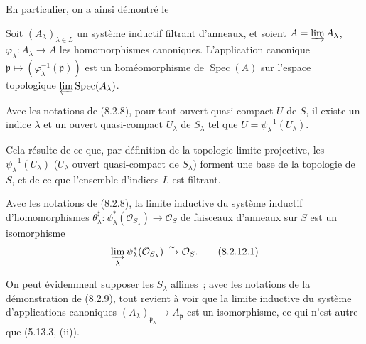 En particulier, on a ainsi démontré le

\begin{corollary}[8.2.10]
\label{IV.8.2.10-fr}
Soit $(A_\lambda)_{\lambda\in L}$ un système inductif filtrant d'anneaux, et
soient $A=\varinjlim A_\lambda$, $\varphi_\lambda:A_\lambda\to A$ les
homomorphismes canoniques. L'application canonique
$\mathfrak p\mapsto(\varphi_\lambda^{-1}(\mathfrak p))$ est un
homéomorphisme de $\operatorname{Spec}(A)$ sur l'espace topologique
$\varprojlim\operatorname{Spec}(A_\lambda)$.
\end{corollary}

\begin{corollary}[8.2.11]
Avec les notations de (8.2.8), pour tout ouvert quasi-compact $U$ de $S$, il
existe un indice $\lambda$ et un ouvert quasi-compact $U_\lambda$ de
$S_\lambda$ tel que $U=\psi_\lambda^{-1}(U_\lambda)$.
\end{corollary}

Cela résulte de ce que, par définition de la topologie limite projective, les
$\psi_\lambda^{-1}(U_\lambda)$ ($U_\lambda$ ouvert quasi-compact de
$S_\lambda$) forment une base de la topologie de $S$, et de ce que l'ensemble
d'indices $L$ est filtrant.

\begin{corollary}[8.2.12]
\label{IV.8.2.12-fr}
Avec les notations de (8.2.8), la limite inductive du système inductif
d'homomorphismes
$\theta_\lambda^\sharp:\psi_\lambda^*(\mathcal O_{S_\lambda})\to
\mathcal O_S$ de faisceaux d'anneaux sur $S$ est un isomorphisme
\begin{equation}
\varinjlim_\lambda\psi_\lambda^*(\mathcal O_{S_\lambda})
\xrightarrow{\sim}\mathcal O_S.
\tag{8.2.12.1}\label{IV.8.2.12.1-fr}
\end{equation}
\end{corollary}

On peut évidemment supposer les $S_\lambda$ affines~; avec les notations de
la démonstration de (8.2.9), tout revient à voir que la limite inductive du
système d'applications canoniques
$(A_\lambda)_{\mathfrak p_\lambda}\to A_{\mathfrak p}$ est un isomorphisme,
ce qui n'est autre que (5.13.3, (ii)).

